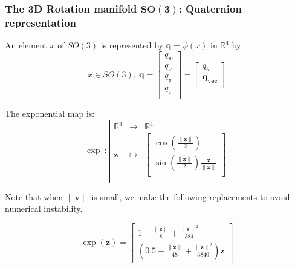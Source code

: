 \subsubsection{The 3D Rotation manifold $\mathbf{SO(3)}$: Quaternion representation}
\label{ssub:the_3d_rotation_manifold_quaternion_representation}
An element $x$ of $SO(3)$ is represented by $\mathbf{q}=\psi(x)$ in $\mathbb{R}^{4}$ by:
\begin{equation}
  x\in SO(3),\ \mathbf{q} =\begin{bmatrix}
    q_{w}\\
    q_{x}\\
    q_{y}\\
    q_{z}\\
  \end{bmatrix}
  =\begin{bmatrix}
    q_{w}\\
    \mathbf{q_{vec}}\\
  \end{bmatrix}
\end{equation}

The exponential map is:
\begin{equation}
  \exp\ :\left|
  \begin{array}{ccc}
    \mathbb{R}^3 & \rightarrow & \mathbb{R}^4 \\
    \mathbf{z} & \mapsto & \begin{bmatrix}
      \cos \left( \frac{\|\mathbf{z}\|}{2} \right)\\
      \sin \left( \frac{\|\mathbf{z}\|}{2} \right) \frac{\mathbf{z}}{\|\mathbf{z}\|}\\
    \end{bmatrix} \\
  \end{array} \nonumber%
  \right.
\end{equation}

Note that when $\|\mathbf{v}\|$ is small, we make the following replacements to avoid numerical instability.

\begin{equation}
  \exp(\mathbf{z}) = \begin{bmatrix}
    1 -\frac{\|\mathbf{z}\|}{8} + \frac{{\|\mathbf{z}\|}^2}{384}\\
    \left(0.5 - \frac{\|\mathbf{z}\|}{48} + \frac{{\|\mathbf{z}\|}^2}{3840}\right)\mathbf{z}
  \end{bmatrix}
\end{equation}


